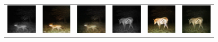\begin{figure}[htp!]
\begin{tabularx}{\textwidth}{Y Y Y !{\space} Y Y Y}
        \includegraphics{gfx/diffusion-sampling-intensity-qual/nir_S2_B06_R1_PICT0128.jpg} & \includegraphics{gfx/diffusion-sampling-intensity-qual/cyclegan_S2_B06_R1_PICT0128_fake.png} & \includegraphics{gfx/diffusion-sampling-intensity-qual/diffusion_S2_B06_R1_PICT0128.png} & \includegraphics{gfx/diffusion-sampling-intensity-qual/nir_S2_B06_R1_PICT0279.jpg} & \includegraphics{gfx/diffusion-sampling-intensity-qual/cyclegan_S2_B06_R1_PICT0279_fake.png} & \includegraphics{gfx/diffusion-sampling-intensity-qual/diffusion_S2_B06_R1_PICT0279.png} \\

\end{tabularx}
\end{figure}
